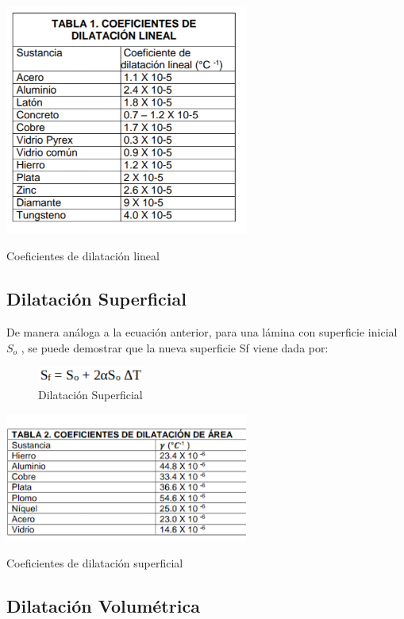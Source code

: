 \documentclass[journal,transmag]{IEEEtran}
\begin{document}
		\begin{table}[!h]
\center
\includegraphics[width=8cm]{table1.png}
\caption{Coeficientes de dilatación lineal}
\label{T2}
\end{table}
		
		
		
\subsection{Dilatación Superficial}

	De manera análoga a la ecuación anterior, para una lámina con superficie inicial $S_{o}$ , se puede demostrar que la nueva superficie Sf viene dada por:
	\begin{figure}[!h]
		\center
		\includegraphics[width=3.5cm]{eq3.png}
		\caption{Dilatación Superficial}
		\label{3}
		\end{figure}
		
	\begin{table}[!h]
\center
\includegraphics[width=8cm]{table2.png}
\caption{Coeficientes de dilatación superficial}
\label{T3}
\end{table}	


		\subsection{Dilatación Volumétrica}
	
\end{document}
